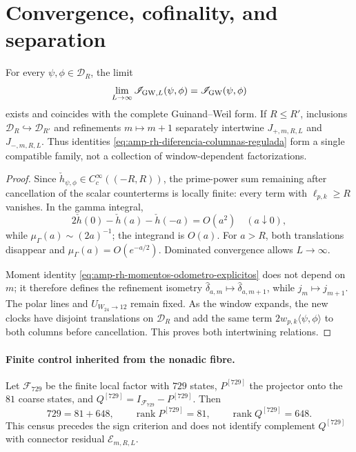 \section*{Convergence, cofinality, and separation}

\begin{proposition}
\label{prop:amp-rh-convergencia-cofinal}
For every \(\psi,\phi\in\mathcal D_R\), the limit
\[
 \lim_{L\to\infty}\mathscr I_{{\rm GW},L}(\psi,\phi)
 =\mathscr I_{\rm GW}(\psi,\phi)
\]
exists and coincides with the complete Guinand--Weil form. If \(R\leq R'\), inclusions \(\mathcal D_R\hookrightarrow\mathcal D_{R'}\) and refinements \(m\mapsto m+1\) separately intertwine \(J_{+,m,R,L}\) and \(J_{-,m,R,L}\). Thus identities \eqref{eq:amp-rh-diferencia-columnas-regulada} form a single compatible family, not a collection of window-dependent factorizations.
\end{proposition}

\begin{proof}
Since \(\check h_{\psi,\phi}\in C_c^\infty((-R,R))\), the prime-power sum remaining after cancellation of the scalar counterterms is locally finite: every term with \(\ell_{p,k}\geq R\) vanishes. In the gamma integral,
\[
 2\check h(0)-\check h(a)-\check h(-a)=O(a^2)
 \quad(a\downarrow0),
\]
while \(\mu_\Gamma(a)\sim(2a)^{-1}\); the integrand is \(O(a)\). For \(a>R\), both translations disappear and \(\mu_\Gamma(a)=O(e^{-a/2})\). Dominated convergence allows \(L\to\infty\).

Moment identity \eqref{eq:amp-rh-momentos-odometro-explicitos} does not depend on \(m\); it therefore defines the refinement isometry \(\widehat\delta_{a,m}\mapsto\widehat\delta_{a,m+1}\), while \(j_m\mapsto j_{m+1}\). The polar lines and \(U_{W_{24}\to12}\) remain fixed. As the window expands, the new clocks have disjoint translations on \(\mathcal D_R\) and add the same term \(2w_{p,k}\langle\psi,\phi\rangle\) to both columns before cancellation. This proves both intertwining relations.
\end{proof}

\paragraph{Finite control inherited from the nonadic fibre.}
Let \(\mathscr F_{729}\) be the finite local factor with \(729\) states, \(P^{[729]}\) the projector onto the \(81\) coarse states, and \(Q^{[729]}=I_{\mathscr F_{729}}-P^{[729]}\). Then
\begin{equation}\label{eq:amp-rh-729-81-648}
 729=81+648,\qquad
 \operatorname{rank}P^{[729]}=81,\qquad
 \operatorname{rank}Q^{[729]}=648.
\end{equation}
This census precedes the sign criterion and does not identify complement \(Q^{[729]}\) with connector residual \(\mathcal E_{m,R,L}\).

